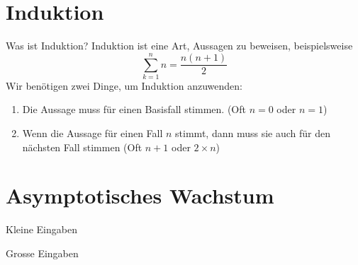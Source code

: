 \documentclass[aspectratio=169]{beamer}
\begin{document}
  \section{Induktion}
  \begin{frame}{Was ist Induktion?}
    Induktion ist eine Art, Aussagen zu beweisen, beispielsweise \[\sum_{k=1}^n n = \frac{n(n+1)}{2}\] Wir benötigen zwei Dinge, um Induktion anzuwenden:
    \begin{enumerate}
      \item Die Aussage muss für einen Basisfall stimmen. (Oft \(n=0\) oder \(n=1\))
      \item Wenn die Aussage für einen Fall \(n\) stimmt, dann muss sie auch für den nächsten Fall stimmen (Oft \(n+1\) oder \(2\times n\))
    \end{enumerate}
  \end{frame}
  \section{Asymptotisches Wachstum}
  \begin{frame}{Kleine Eingaben}
    \begin{center}
    \end{center}
  \end{frame}
  \begin{frame}{Grosse Eingaben}
    \begin{center}
    \end{center}
  \end{frame}
\end{document}
